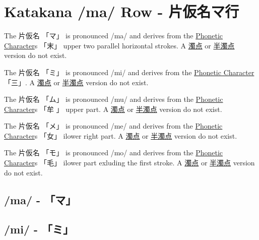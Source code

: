 \section{Katakana /ma/ Row - 片仮名マ行}\label{sec:KatakanaMaRow}


\label{letter:ma} The  片仮名 {「マ」} is pronounced  /ma/ and  derives from the
\hyperref[sec:PhoneticCharacter]{Phonetic Character}s {「末」} upper two parallel
horizontal strokes.  A \hyperref[sec:Dakuten]{濁点} or
\hyperref[sec:Handakuten]{半濁点} version do not exist.

\label{letter:mi} The  片仮名 {「ミ」} is pronounced  /mi/ and  derives from the
\hyperref[sec:PhoneticCharacter]{Phonetic Character} {「三」}.  A
\hyperref[sec:Dakuten]{濁点} or \hyperref[sec:Handakuten]{半濁点} version do
not exist.

\label{letter:mu} The  片仮名 {「ム」} is pronounced  /mu/ and  derives from the
\hyperref[sec:PhoneticCharacter]{Phonetic Character}s {「牟 」} upper part.  A
\hyperref[sec:Dakuten]{濁点} or \hyperref[sec:Handakuten]{半濁点} version do
not exist.

\newpage

\label{letter:me} The  片仮名 {「メ」} is pronounced  /me/ and  derives from the
\hyperref[sec:PhoneticCharacter]{Phonetic Character}s {「女」} ilower right part.  A
\hyperref[sec:Dakuten]{濁点} or \hyperref[sec:Handakuten]{半濁点} version do
not exist.



\label{letter:mo} The  片仮名 {「モ」} is pronounced  /mo/ and  derives from the
\hyperref[sec:PhoneticCharacter]{Phonetic Character}s {「毛」} ilower part exluding the
first stroke.  A \hyperref[sec:Dakuten]{濁点} or
\hyperref[sec:Handakuten]{半濁点} version do not exist.

\newpage

\subsection{/ma/ - 「マ」} \label{sec:KatakanaMa}

 

\subsection{/mi/ - 「ミ」} \label{sec:KatakanaMi}

